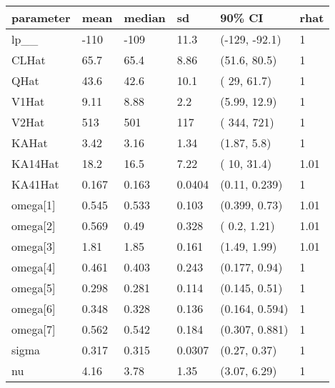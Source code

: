 
\begin{tabular}{l|l|l|l|l|l}
\hline
parameter & mean & median & sd & 90\% CI & rhat\\
\hline
lp\_\_ & -110 & -109 & 11.3 & (-129, -92.1) & 1\\
\hline
CLHat & 65.7 & 65.4 & 8.86 & (51.6, 80.5) & 1\\
\hline
QHat & 43.6 & 42.6 & 10.1 & (  29, 61.7) & 1\\
\hline
V1Hat & 9.11 & 8.88 & 2.2 & (5.99, 12.9) & 1\\
\hline
V2Hat & 513 & 501 & 117 & ( 344,  721) & 1\\
\hline
KAHat & 3.42 & 3.16 & 1.34 & (1.87,  5.8) & 1\\
\hline
KA14Hat & 18.2 & 16.5 & 7.22 & (  10, 31.4) & 1.01\\
\hline
KA41Hat & 0.167 & 0.163 & 0.0404 & (0.11, 0.239) & 1\\
\hline
omega[1] & 0.545 & 0.533 & 0.103 & (0.399, 0.73) & 1.01\\
\hline
omega[2] & 0.569 & 0.49 & 0.328 & ( 0.2, 1.21) & 1.01\\
\hline
omega[3] & 1.81 & 1.85 & 0.161 & (1.49, 1.99) & 1.01\\
\hline
omega[4] & 0.461 & 0.403 & 0.243 & (0.177, 0.94) & 1\\
\hline
omega[5] & 0.298 & 0.281 & 0.114 & (0.145, 0.51) & 1\\
\hline
omega[6] & 0.348 & 0.328 & 0.136 & (0.164, 0.594) & 1\\
\hline
omega[7] & 0.562 & 0.542 & 0.184 & (0.307, 0.881) & 1\\
\hline
sigma & 0.317 & 0.315 & 0.0307 & (0.27, 0.37) & 1\\
\hline
nu & 4.16 & 3.78 & 1.35 & (3.07, 6.29) & 1\\
\hline
\end{tabular}
